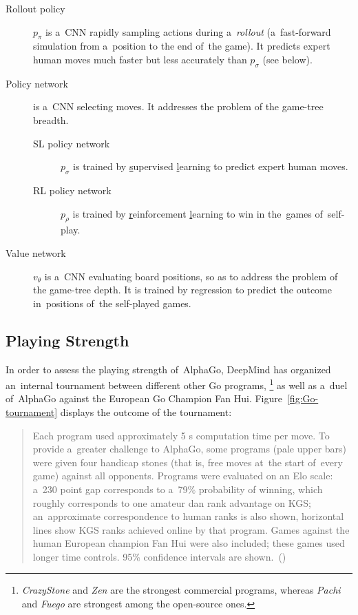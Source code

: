 \begin{description}
  \item [Rollout policy] $p_\pi$ is a~CNN rapidly sampling actions during a~\emph{rollout} (a~fast-forward simulation from a~position to the end of~the game).
    It predicts expert human moves much faster but less accurately than $p_\sigma$ (see below).

  \item [Policy network] is a~CNN selecting moves.
    It addresses the problem of the game-tree breadth.
    \begin{description}
      \item [SL policy network] $p_\sigma$ is trained by \underline{s}upervised \underline{l}earning to predict expert human moves.
        \item [RL policy network] $p_\rho$ is trained by \underline{r}einforcement \underline{l}earning to win in the~games of~self-play.
    \end{description}

  \item [Value network] $v_\theta$ is a~CNN evaluating board positions, so as to address the problem of the game-tree depth.
    It is trained by regression to predict the outcome in~positions of~the self-played games.
\end{description}

\subsection{Playing Strength}

In order to assess the playing strength of~AlphaGo, DeepMind has organized an~internal tournament between different other Go programs,%
\footnote{\emph{CrazyStone} and \emph{Zen} are the strongest commercial programs, whereas \emph{Pachi} and \emph{Fuego} are strongest among the open-source ones.}
as well as a~duel of~AlphaGo against the European Go Champion Fan Hui.
Figure~\ref{fig:Go-tournament} displays the outcome of the tournament:

\begin{quotation}
  Each program used approximately 5 s computation time per move.
  To provide a~greater challenge to AlphaGo, some programs (pale upper bars) were given four handicap stones (that is, free moves at~the start of~every game) against all opponents.
  Programs were evaluated on an Elo scale: a~230 point gap corresponds to a~79\% probability of winning, which roughly corresponds to one amateur dan rank advantage on KGS;
  an~approximate correspondence to human ranks is also shown, horizontal lines show KGS ranks achieved online by that program.
  Games against the human European champion Fan Hui were also included;
  these games used longer time controls.
  95\% confidence intervals are shown.~(\cite{Silver2016mastering})
\end{quotation}


